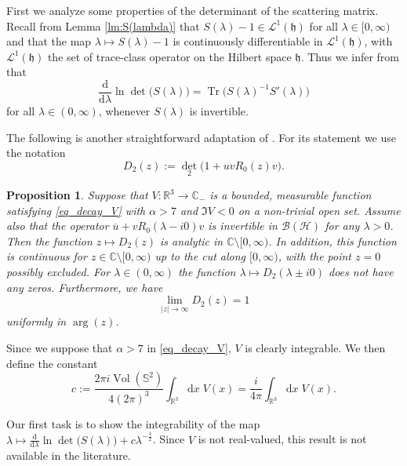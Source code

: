 \documentclass{article}
\def\B{\mathscr B}
\def\C{\mathbb C}
\def\d{\mathrm{d}}
\def\H{\mathcal H}
\def\L{\mathcal L}
\def\R{\mathbb R}
\def\S{\mathbb S}
\def\HS{\mathfrak h}
\def\Tr{\mathop{\mathrm{Tr}}\nolimits}
\def\vol{\mathop{\mathrm{Vol}}\nolimits}
\newtheorem{Proposition}[Theorem]{Proposition}
\begin{document}
First we analyze some properties of the determinant of the scattering matrix. 
Recall from Lemma \ref{lm:S(lambda)} that $S(\lambda)-1 \in \L^1(\HS)$ for all $\lambda \in [0,\infty)$ and that the map $\lambda \mapsto S(\lambda)-1$ is continuously differentiable in $\L^1(\HS)$, with $\L^1(\HS)$ the set of trace-class operator on the Hilbert space $\HS$.
Thus we infer from \cite[Equation IV.1.14]{GK} that
\begin{equation*}
    \frac{\d}{\d \lambda} \ln \det\big(S(\lambda)\big) = \Tr\big(S(\lambda)^{-1} S'(\lambda)\big)
\end{equation*}
for all $\lambda \in (0,\infty)$, whenever $S(\lambda)$ is invertible.

The following is another straightforward adaptation of \cite[Prop.~9.1.1, 9.1.2 and 9.1.3]{Yaf10}.
For its statement we use the notation
$$
D_2(z) := {\det}_2\big(1+uvR_0(z)v\big).
$$

\begin{Proposition}\label{prop-det2}
Suppose that $V:\R^3\to \C_-$ is a bounded, measurable function satisfying \eqref{eq_decay_V} with $\alpha>7$ and $\Im V<0$ on a non-trivial open set. 
Assume also that the operator $\overline{u} + vR_0(\lambda-i0)v$ is invertible in $\B(\H)$ for any $\lambda>0$.
Then the function $z\mapsto D_2(z)$ is analytic in $\C \setminus [0,\infty)$. In addition, this function is continuous for $z \in \C \setminus [0,\infty)$ up to the cut along $[0,\infty)$, with the point $z = 0$ possibly excluded. For $\lambda \in (0,\infty)$ the function $\lambda \mapsto D_2(\lambda \pm i 0)$ does not have any zeros. Furthermore, we have
\begin{equation*}
\lim_{|z| \to \infty} D_2(z) = 1
\end{equation*}
uniformly in $\arg(z)$.
\end{Proposition}

Since we suppose that $\alpha > 7$ in \eqref{eq_decay_V}, $V$ is clearly integrable. We then define the constant  
\begin{equation}\label{eq_constant}
c := \frac{2\pi i \vol(\S^2)}{4(2\pi)^3} \int_{\R^3} \d x \;\!V(x)
= \frac{i}{4 \pi} \int_{\R^3} \d x\;\! V(x).
\end{equation}

Our first task is to show the integrability of the map $\lambda \mapsto \frac{\d}{\d \lambda} \ln\det\big(S(\lambda)\big) +c \lambda^{-\frac12}$.
Since $V$ is not real-valued, this result is not available in the literature.  
\end{document}
